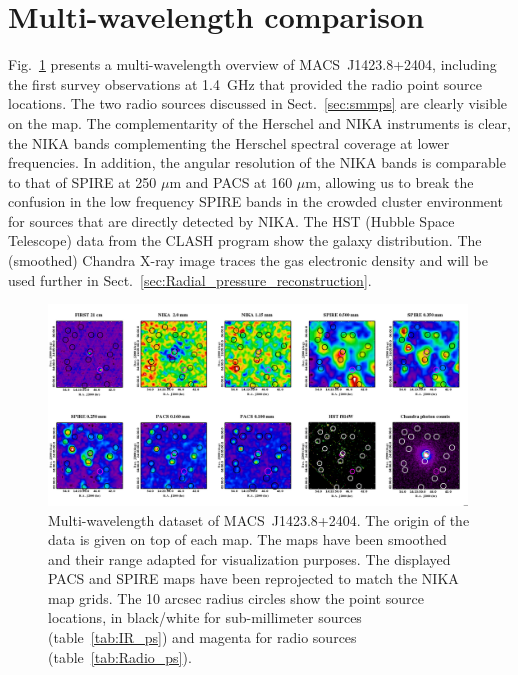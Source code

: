 \documentclass[twocolumn,traditabstract]{aa}
\begin{document}
\section{Multi-wavelength comparison}\label{sec:Multi_wavelength_comparison}
Fig.~\ref{fig:MACSJ1424_mutiw2} presents a multi-wavelength overview of \mbox{MACS~J1423.8+2404}, including the {\sc first} survey \citep[Faint Images of the Radio Sky at Twenty-Centimeters,][]{becker1995} observations at 1.4~GHz that provided the radio point source locations. The two radio sources discussed in Sect.~\ref{sec:smmps} are clearly visible on the map. The complementarity of the Herschel and NIKA instruments is clear, the NIKA bands complementing the Herschel spectral coverage at lower frequencies. In addition, the angular resolution of the NIKA bands is comparable to that of SPIRE at 250 $\mu$m and PACS at 160 $\mu$m, allowing us to break the confusion in the low frequency SPIRE bands in the crowded cluster environment for sources that are directly detected by NIKA. The HST (Hubble Space Telescope) data from the CLASH program \citep[][Cluster Lensing And Supernova survey with Hubble]{postman2012} show the galaxy distribution. The (smoothed) Chandra X-ray image traces the gas electronic density and will be used further in Sect.~\ref{sec:Radial_pressure_reconstruction}.

\begin{figure}[h]
\centering
\includegraphics[trim=0cm 0cm 0cm 0cm, clip=true, width=0.99\textwidth]{Figure/MACSJ1424_multicolor.png}
\caption{\footnotesize Multi-wavelength dataset of \mbox{MACS~J1423.8+2404}. The origin of the data is given on top of each map. The maps have been smoothed and their range adapted for visualization purposes. The displayed PACS and SPIRE maps have been reprojected to match the NIKA map grids. The 10 arcsec radius circles show the point source locations, in black/white for sub-millimeter sources (table~\ref{tab:IR_ps}) and magenta for radio sources (table~\ref{tab:Radio_ps}).}
\label{fig:MACSJ1424_mutiw2}
\end{figure}
\end{document}
